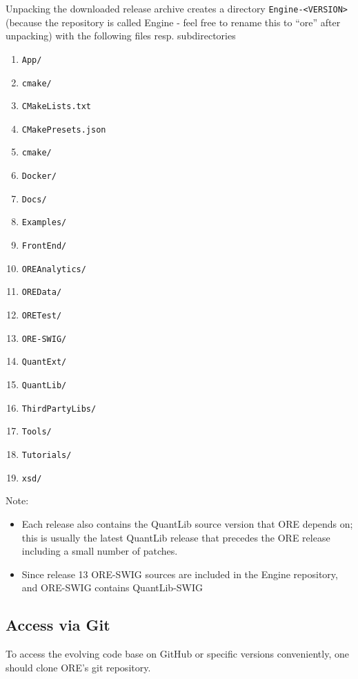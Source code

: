 Unpacking the downloaded release archive creates a directory {\tt Engine-<VERSION>} (because the repository is called Engine - 
feel free to rename this to ``ore'' after unpacking) with the following files resp. subdirectories
\begin{enumerate}
\item {\tt App/}
\item {\tt cmake/}
\item {\tt CMakeLists.txt}
\item {\tt CMakePresets.json}
\item {\tt cmake/}
\item {\tt Docker/}
\item {\tt Docs/}
\item {\tt Examples/}
\item {\tt FrontEnd/}
\item {\tt OREAnalytics/}
\item {\tt OREData/}
\item {\tt ORETest/}
\item {\tt ORE-SWIG/}  
\item {\tt QuantExt/}
\item {\tt QuantLib/}
\item {\tt ThirdPartyLibs/}
\item {\tt Tools/}
\item {\tt Tutorials/}
\item {\tt xsd/}
\end{enumerate} 

Note:
\begin{itemize}
\item Each release also contains the QuantLib source version that ORE depends on; this is usually the latest QuantLib release that precedes the ORE release including a small number of patches.
\item Since release 13 ORE-SWIG sources are included in the Engine repository, and ORE-SWIG contains QuantLib-SWIG
\end{itemize}

\subsection{Access via Git}\label{sec:build_ore}

To access the evolving code base on GitHub or specific versions conveniently, one should clone ORE's git repository. 
   
